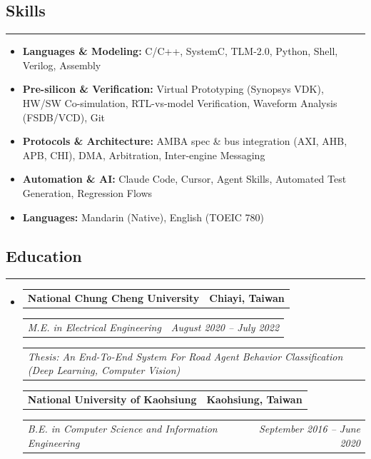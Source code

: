 \documentclass[11pt,a4paper]{article}
\makeatletter
\newcommand{\headerrow}[2]
{\begin{tabular*}{\linewidth}{l@{\extracolsep{\fill}}r}
#1 &
#2 \\
\end{tabular*}}
\makeatother
\begin{document}
\subsection*{\large Skills}
\hrule
\vspace{0.3em}

\begin{itemize}[leftmargin=1em,noitemsep]
	\item \textbf{Languages \& Modeling:}
	      C/C++, SystemC, TLM-2.0, Python, Shell, Verilog, Assembly
	\item \textbf{Pre-silicon \& Verification:}
	      Virtual Prototyping (Synopsys VDK), HW/SW Co-simulation, RTL-vs-model Verification, Waveform Analysis (FSDB/VCD), Git
	\item \textbf{Protocols \& Architecture:}
	      AMBA spec \& bus integration (AXI, AHB, APB, CHI), DMA, Arbitration, Inter-engine Messaging
	\item \textbf{Automation \& AI:}
	      Claude Code, Cursor, Agent Skills, Automated Test Generation, Regression Flows
    \item \textbf{Languages:}
          Mandarin (Native), English (TOEIC 780)
\end{itemize}

\subsection*{\large Education}
\hrule
\vspace{0.3em}

\begin{itemize}[leftmargin=1em]
	\parskip=0.1em

	\item
	      \headerrow
	      {\textbf{National Chung Cheng University}}
	      {\textbf{Chiayi, Taiwan}}
	      \headerrow
	      {\emph{M.E. in Electrical Engineering}}
	      {\emph{August 2020 -- July 2022}}
          \headerrow
          {\emph{Thesis: An End-To-End System For Road Agent Behavior Classification (Deep Learning, Computer Vision)}}
          {\emph{}}

	      \headerrow
          {\textbf{National University of Kaohsiung}}
	      {\textbf{Kaohsiung, Taiwan}}
          \headerrow
	      {\emph{B.E. in Computer Science and Information Engineering}}
	      {\emph{September 2016 -- June 2020}}
\end{itemize}
\end{document}
